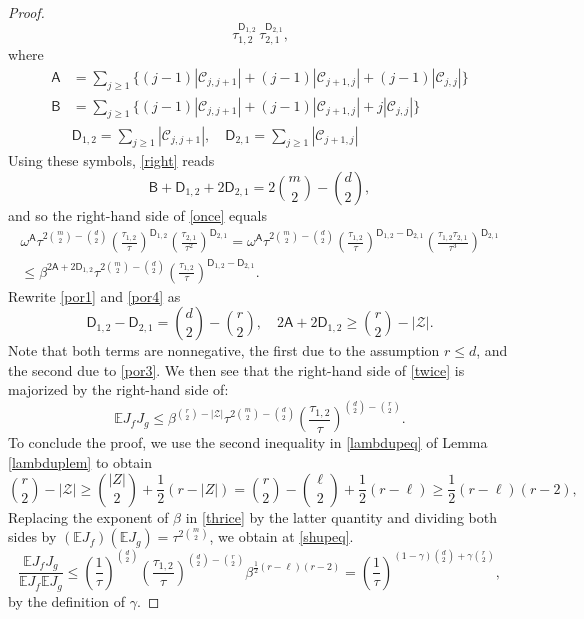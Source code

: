 \documentclass[10pt,a4paper]{amsart}
\def\CC{\mathscr{C}}
\def\E{\mathbb{E}}
\def\ZZ{\mathscr Z}
\begin{document}
\begin{proof}
\begin{equation}
\, \tau_{1,2}^{\mathsf D_{1,2}}
\, \tau_{2,1}^{\mathsf D_{2,1}},
\end{equation}
where
\begin{align*}
\mathsf A &= \sum_{j \ge 1} 
\big\{(j-1) |\CC_{j,j+1}| + (j-1) |\CC_{j+1,j}| + (j-1) |\CC_{j,j}| \big\}
\\
\mathsf B &= \sum_{j \ge 1} 
\big\{(j-1) |\CC_{j,j+1}| + (j-1) |\CC_{j+1,j}| + j |\CC_{j,j}| \big\}
\\ & \mathsf D_{1,2} = \sum_{j \ge 1} |\CC_{j,j+1}|, \quad
\mathsf D_{2,1} = \sum_{j \ge 1} |\CC_{j+1,j}|
\end{align*}
Using these symbols, \eqref{right} reads
\[
\mathsf B + \mathsf D_{1,2} + 2 \mathsf D_{2,1} = 2 \binom{m}{2}-\binom{d}{2},
\]
and so the right-hand side of \eqref{once} equals
\begin{align}
\omega^{\mathsf A} \tau^{2 \binom{m}{2}-\binom{d}{2}}
\left(\frac{\tau_{1,2}}{\tau}\right)^{\mathsf D_{1,2}} 
\left(\frac{\tau_{2,1}}{\tau^2}\right)^{\mathsf D_{2,1}} 
=
\omega^{\mathsf A} \tau^{2 \binom{m}{2}-\binom{d}{2}}
\left(\frac{\tau_{1,2}}{\tau}\right)^{\mathsf D_{1,2}-\mathsf D_{2,1}}
\left(\frac{\tau_{1,2}\tau_{2,1}}{\tau^3}\right)^{\mathsf D_{2,1}} 
\nonumber
\\
\le \beta^{2 \mathsf A+2 \mathsf D_{1,2}} \tau^{2 \binom{m}{2}-\binom{d}{2}}
\left(\frac{\tau_{1,2}}{\tau}\right)^{\mathsf D_{1,2}-\mathsf D_{2,1}} .
\label{twice}
\end{align}
Rewrite \eqref{por1} and \eqref{por4} as
\[
\mathsf D_{1,2}-\mathsf D_{2,1} = \binom{d}{2}-\binom{r}{2},
\quad
2 \mathsf A+2 \mathsf D_{1,2} \ge \binom{r}{2}-|\ZZ|.
\]
Note that both terms are nonnegative, the first due to the assumption
$r \le d$, and the second due to \eqref{por3}.
We then see that the right-hand side of 
\eqref{twice} is majorized by the right-hand side
of:
\begin{equation}
\label{thrice}
\E J_f J_g 
\le 
\beta^{\binom{r}{2}-|\ZZ|} \tau^{2\binom{m}{2}-\binom{d}{2}}
\left(\frac{\tau_{1,2}}{\tau}\right)^{\binom{d}{2}-\binom{r}{2}}.
\end{equation}
To conclude the proof, we use the second inequality 
in \eqref{lambdupeq} of Lemma \eqref{lambduplem} to obtain
\[
\binom{r}{2}-|\ZZ| \ge \binom{|Z|}{2}+\frac12 (r-|Z|)
= \binom{r}{2}- \binom{\ell}{2}+\frac12 (r-\ell)
\ge \frac12 (r-\ell)(r-2),
\]
Replacing the exponent of $\beta$ in \eqref{thrice} by the latter
quantity and
dividing both sides by $(\E J_f)(\E J_g) = \tau^{2\binom{m}{2}}$,
we obtain at \eqref{shupeq}.
\[
\frac{\E J_f J_g}{\E J_f \E J_g}
\le \left( \frac{1}{\tau} \right)^{\binom{d}{2}}
\left( \frac{\tau_{1,2}}{\tau} \right)^{\binom{d}{2} - \binom{r}{2}} 
\beta^{\frac{1}{2}(r - \ell)(r-2)}
=  \left( \frac{1}{\tau} \right)^{(1-\gamma)\binom{d}{2} + \gamma\binom{r}{2}},
\]
by the definition of $\gamma$.
\end{proof}
\end{document}
